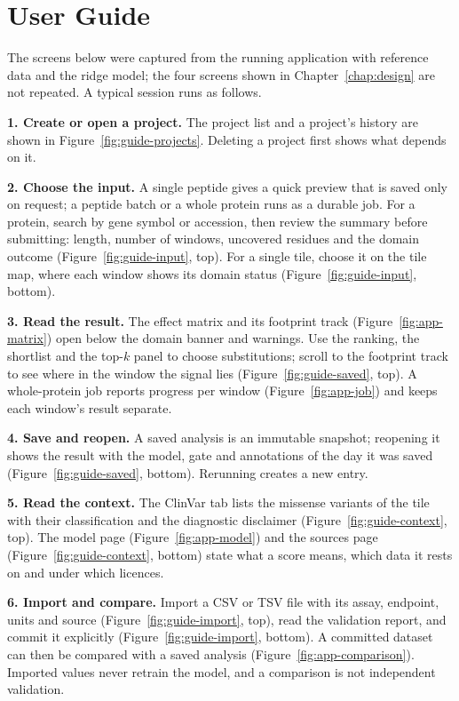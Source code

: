 \section{User Guide}
The screens below were captured from the running application with reference data and the ridge
model; the four screens shown in Chapter~\ref{chap:design} are not repeated. A typical session runs
as follows.

\textbf{1. Create or open a project.} The project list and a project's history are shown in
Figure~\ref{fig:guide-projects}. Deleting a project first shows what depends on it.

\textbf{2. Choose the input.} A single peptide gives a quick preview that is saved only on request;
a peptide batch or a whole protein runs as a durable job. For a protein, search by gene symbol or
accession, then review the summary before submitting: length, number of windows, uncovered residues
and the domain outcome (Figure~\ref{fig:guide-input}, top). For a single tile, choose it on the tile
map, where each window shows its domain status (Figure~\ref{fig:guide-input}, bottom).

\textbf{3. Read the result.} The effect matrix and its footprint track
(Figure~\ref{fig:app-matrix}) open below the domain banner and warnings. Use the ranking, the
shortlist and the top-$k$ panel to choose substitutions; scroll to the footprint track to see where in
the window the signal lies (Figure~\ref{fig:guide-saved}, top). A whole-protein job reports progress
per window (Figure~\ref{fig:app-job}) and keeps each window's result separate.

\textbf{4. Save and reopen.} A saved analysis is an immutable snapshot; reopening it shows the result
with the model, gate and annotations of the day it was saved (Figure~\ref{fig:guide-saved}, bottom).
Rerunning creates a new entry.

\textbf{5. Read the context.} The ClinVar tab lists the missense variants of the tile with their
classification and the diagnostic disclaimer (Figure~\ref{fig:guide-context}, top). The model page
(Figure~\ref{fig:app-model}) and the sources page (Figure~\ref{fig:guide-context}, bottom) state
what a score means, which data it rests on and under which licences.

\textbf{6. Import and compare.} Import a CSV or TSV file with its assay, endpoint, units and source
(Figure~\ref{fig:guide-import}, top), read the validation report, and commit it explicitly
(Figure~\ref{fig:guide-import}, bottom). A committed dataset can then be compared with a saved
analysis (Figure~\ref{fig:app-comparison}). Imported values never retrain the model, and a comparison
is not independent validation.

